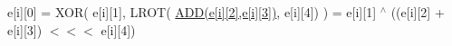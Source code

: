 e\mbox{[}i\mbox{]}\mbox{[}0\mbox{]} = \-X\-O\-R( e\mbox{[}i\mbox{]}\mbox{[}1\mbox{]}, \-L\-R\-O\-T( \hyperlink{common_8hh_af3b709fb668cf93ca09e2a46a2a031a8}{\-A\-D\-D(e\mbox{[}i\mbox{]}\mbox{[}2\mbox{]},e\mbox{[}i\mbox{]}\mbox{[}3\mbox{]})}, e\mbox{[}i\mbox{]}\mbox{[}4\mbox{]}) ) = e\mbox{[}i\mbox{]}\mbox{[}1\mbox{]} $^\wedge$ ((e\mbox{[}i\mbox{]}\mbox{[}2\mbox{]} + e\mbox{[}i\mbox{]}\mbox{[}3\mbox{]}) $<$$<$$<$ e\mbox{[}i\mbox{]}\mbox{[}4\mbox{]}) 